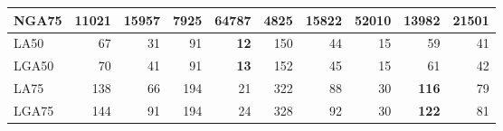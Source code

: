 \documentclass[12pt,a4paper]{article}
\begin{document}
\begin{table}[ht]
\begin{center}
\begin{tabular}{|l*{9}{|r}|}
NGA75 & 11021 & 15957 & {\bf 7925} & 64787 & 4825 & 15822 & 52010 & 13982 & 21501 \\ \hline
LA50 & 67 & 31 & 91 & {\bf 12} & 150 & 44 & 15 & 59 & 41 \\ \hline
LGA50 & 70 & 41 & 91 & {\bf 13} & 152 & 45 & 15 & 61 & 42 \\ \hline
LA75 & 138 & 66 & 194 & 21 & 322 & 88 & 30 & {\bf 116} & 79 \\ \hline
LGA75 & 144 & 91 & 194 & 24 & 328 & 92 & 30 & {\bf 122} & 81 \\ \hline
\end{tabular}
\end{center}
\end{table}
\end{document}
